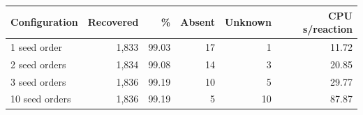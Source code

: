 \begin{tabular}{lrrrrr}\toprule
Configuration & Recovered & \% & Absent & Unknown & CPU s/reaction\\\midrule
1 seed order & 1,833 & 99.03 & 17 & 1 & 11.72 \\
2 seed orders & 1,834 & 99.08 & 14 & 3 & 20.85 \\
3 seed orders & 1,836 & 99.19 & 10 & 5 & 29.77 \\
10 seed orders & 1,836 & 99.19 & 5 & 10 & 87.87 \\
\bottomrule\end{tabular}

